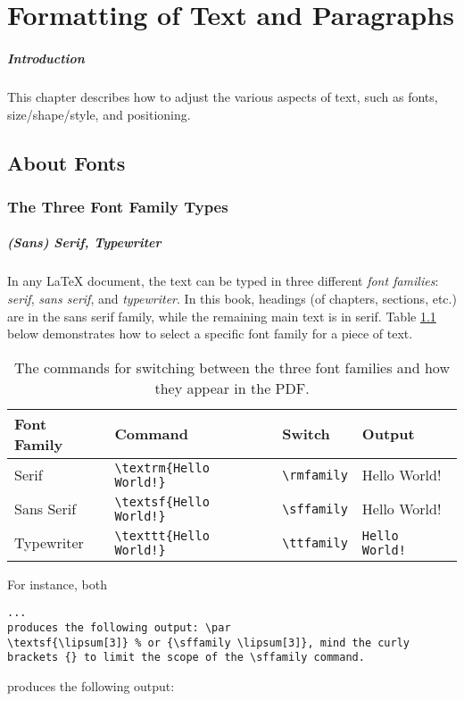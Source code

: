\chapter{Formatting of Text and Paragraphs}

\paragraph{Introduction}
This chapter describes how to adjust the various aspects of text, such as fonts, size/shape/style, and positioning.

\section{About Fonts}

\subsection{The Three Font Family Types}

\paragraph{(Sans) Serif, Typewriter}
In any \LaTeX{} document, the text can be typed in three different \textit{font families}: \textit{serif}, \textit{sans serif}, and \textit{typewriter}. In this book, headings (of chapters, sections, etc.) are in the sans serif family, while the remaining main text is in serif. Table \ref{tab:fontfamily} below demonstrates how to select a specific font family for a piece of text.
\begin{table}
\begin{tabularx}{\textwidth}{|l|X|l|l|}
\hline
Font Family & Command & Switch & Output \\
\hline
Serif & \texttt{\textbackslash textrm\{Hello World!\}}& \texttt{\textbackslash rmfamily} & \textrm{Hello World!} \\
\hline
Sans Serif & \texttt{\textbackslash textsf\{Hello World!\}}& \texttt{\textbackslash sffamily} & \textsf{Hello World!} \\
\hline
Typewriter & \texttt{\textbackslash texttt\{Hello World!\}}& \texttt{\textbackslash ttfamily} & \texttt{Hello World!} \\
\hline
\end{tabularx}
\caption{The commands for switching between the three font families and how they appear in the PDF.}
\label{tab:fontfamily}
\end{table}
For instance, both
\begin{lstlisting}
... 
produces the following output: \par
\textsf{\lipsum[3]} % or {\sffamily \lipsum[3]}, mind the curly brackets {} to limit the scope of the \sffamily command.
\end{lstlisting}
produces the following output: \par
{\sffamily \lipsum[3]}

